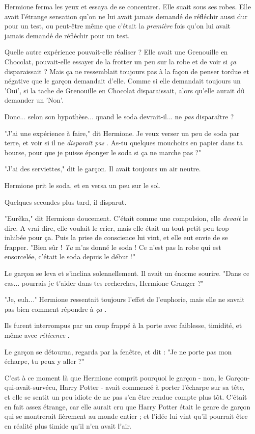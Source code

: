 Hermione ferma les yeux et essaya de se concentrer. Elle suait sous ses robes. Elle avait l'étrange sensation qu'on ne lui avait jamais demandé de réfléchir aussi dur pour un test, ou peut-être même que c'était la \emph{première}  fois qu'on lui avait jamais demandé de réfléchir pour un test.

Quelle autre expérience pouvait-elle réaliser ? Elle avait une Grenouille en Chocolat, pouvait-elle essayer de la frotter un peu sur la robe et de voir si \emph{ça}  disparaissait ? Mais ça ne ressemblait toujours pas à la façon de penser tordue et négative que le garçon demandait d'elle. Comme si elle demandait toujours un 'Oui', si la tache de Grenouille en Chocolat disparaissait, alors qu'elle aurait dû demander un 'Non'.

Donc... selon son hypothèse... quand le soda devrait-il... ne \emph{pas}  disparaître ?

"J'ai une expérience à faire," dit Hermione. Je veux verser un peu de soda par terre, et voir si il ne \emph{disparaît pas} . As-tu quelques mouchoirs en papier dans ta bourse, pour que je puisse éponger le soda si ça ne marche pas ?"

"J'ai des serviettes," dit le garçon. Il avait toujours un air neutre.

Hermione prit le soda, et en versa un peu sur le sol.

Quelques secondes plus tard, il disparut.

"Eurêka," dit Hermione doucement. C'était comme une compulsion, elle \emph{devait}  le dire. A vrai dire, elle voulait le crier, mais elle était un tout petit peu trop inhibée pour ça. Puis la prise de conscience lui vint, et elle eut envie de se frapper. "Bien sûr ! \emph{Tu}  m'as donné le soda ! Ce n'est pas la robe qui est ensorcelée, c'était le soda depuis le début !"

Le garçon se leva et s'inclina solennellement. Il avait un énorme sourire. "Dans ce cas... pourrais-je t'aider dans tes recherches, Hermione Granger ?"

"Je, euh..." Hermione ressentait toujours l'effet de l'euphorie, mais elle ne savait pas bien comment répondre à \emph{ça} .

Ils furent interrompus par un coup frappé à la porte avec faiblesse, timidité, et même avec \emph{réticence} .

Le garçon se détourna, regarda par la fenêtre, et dit : "Je ne porte pas mon écharpe, tu peux y aller ?"

C'est à ce moment là que Hermione comprit pourquoi le garçon - non, le Garçon-qui-avait-survécu, Harry Potter - avait commencé à porter l'écharpe sur sa tête, et elle se sentit un peu idiote de ne pas s'en être rendue compte plus tôt. C'était en fait assez étrange, car elle aurait cru que Harry Potter était le genre de garçon qui se montrerait fièrement au monde entier ; et l'idée lui vint qu'il pourrait être en réalité plus timide qu'il n'en avait l'air.

